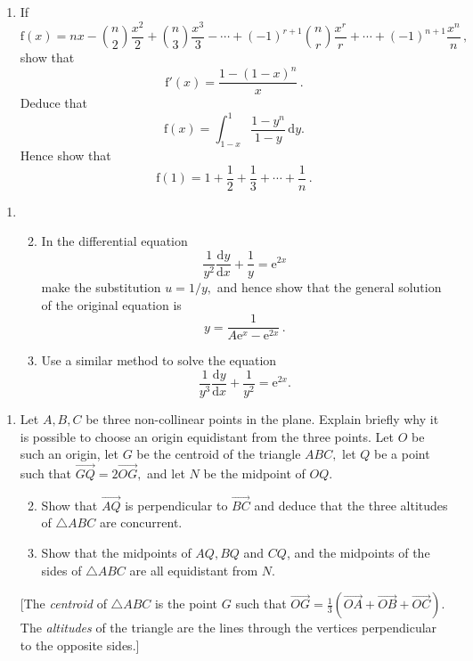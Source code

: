 \documentclass[a4, 11pt]{report}
\newlength{\qspace}
\newcounter{qnumber}
\newenvironment{question}%
 {\vspace{\qspace}
  \begin{enumerate}[\bfseries 1\quad][10]%
    \setcounter{enumi}{\value{qnumber}}%
    \item%
 }
{
  \end{enumerate}
  \filbreak
  \stepcounter{qnumber}
 }
\newenvironment{questionparts}[1][1]%
 {
  \begin{enumerate}[\bfseries (i)]%
    \setcounter{enumii}{#1}
    \addtocounter{enumii}{-1}
    \setlength{\itemsep}{5mm}
    \setlength{\parskip}{8pt}
 }
 {
  \end{enumerate}
 }
\begin{document}
\begin{question}
If 
\[
\mathrm{f}(x)=nx-\binom{n}{2}\frac{x^{2}}{2}+\binom{n}{3}\frac{x^{3}}{3}-\cdots+(-1)^{r+1}\binom{n}{r}\frac{x^{r}}{r}+\cdots+(-1)^{n+1}\frac{x^{n}}{n}\,,
\]
show that 
\[
\mathrm{f}'(x)=\frac{1-(1-x)^{n}}{x}\,.
\]
Deduce that 
\[
\mathrm{f}(x)=\int_{1-x}^{1}\frac{1-y^{n}}{1-y}\,\mathrm{d}y.
\]
Hence show that 
\[
\mathrm{f}(1)=1+\frac{1}{2}+\frac{1}{3}+\cdots+\frac{1}{n}\,.
\]

	\end{question}
	
\begin{question}
\begin{questionparts}
\item In the differential equation 
\[
\frac{1}{y^{2}}\frac{\mathrm{d}y}{\mathrm{d}x}+\frac{1}{y}=\mathrm{e}^{2x}
\]
make the substitution $u=1/y,$ and hence show that the general solution
of the original equation is 
\[
y=\frac{1}{A\mathrm{e}^{x}-\mathrm{e}^{2x}}\,.
\]
\item Use a similar method to solve the equation 
\[
\frac{1}{y^{3}}\frac{\mathrm{d}y}{\mathrm{d}x}+\frac{1}{y^{2}}=\mathrm{e}^{2x}.
\]
\end{questionparts}
\end{question}
	
\begin{question}
Let $A,B,C$ be three non-collinear points in the plane. Explain briefly
why it is possible to choose an origin equidistant from the three
points. Let $O$ be such an origin, let $G$ be the centroid of the
triangle $ABC,$ let $Q$ be a point such that $\overrightarrow{GQ}=2\overrightarrow{OG},$
and let $N$ be the midpoint of $OQ.$ 

\begin{questionparts}
\item Show that $\overrightarrow{AQ}$ is perpendicular to $\overrightarrow{BC}$
and deduce that the three altitudes of $\triangle ABC$ are concurrent. 
\item Show that the midpoints of $AQ,BQ$ and $CQ$, and the midpoints of
the sides of $\triangle ABC$ are all equidistant from $N$. 
\end{questionparts}

{[}The \textit{centroid }of $\triangle ABC$ is the point $G$ such
that $\overrightarrow{OG}=\frac{1}{3}(\overrightarrow{OA}+\overrightarrow{OB}+\overrightarrow{OC}).$
The \textit{altitudes }of the triangle are the lines through the vertices
perpendicular to the opposite sides.{]} 
\end{question}
		
\end{document}
